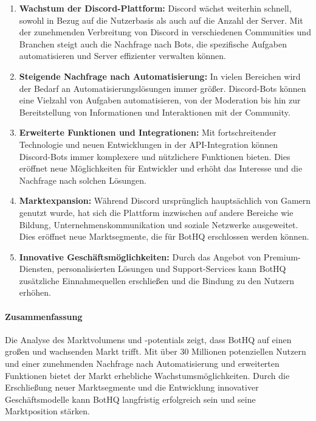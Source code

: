 \begin{enumerate}
  \item \textbf{Wachstum der Discord-Plattform:} Discord wächst weiterhin schnell, sowohl in Bezug auf die Nutzerbasis als auch auf die Anzahl der Server. Mit der zunehmenden Verbreitung von Discord in verschiedenen Communities und Branchen steigt auch die Nachfrage nach Bots, die spezifische Aufgaben automatisieren und Server effizienter verwalten können.

  \item \textbf{Steigende Nachfrage nach Automatisierung:} In vielen Bereichen wird der Bedarf an Automatisierungslösungen immer größer. Discord-Bots können eine Vielzahl von Aufgaben automatisieren, von der Moderation bis hin zur Bereitstellung von Informationen und Interaktionen mit der Community.

  \item \textbf{Erweiterte Funktionen und Integrationen:} Mit fortschreitender Technologie und neuen Entwicklungen in der API-Integration können Discord-Bots immer komplexere und nützlichere Funktionen bieten. Dies eröffnet neue Möglichkeiten für Entwickler und erhöht das Interesse und die Nachfrage nach solchen Lösungen.

  \item \textbf{Marktexpansion:} Während Discord ursprünglich hauptsächlich von Gamern genutzt wurde, hat sich die Plattform inzwischen auf andere Bereiche wie Bildung, Unternehmenskommunikation und soziale Netzwerke ausgeweitet. Dies eröffnet neue Marktsegmente, die für BotHQ erschlossen werden können.

  \item \textbf{Innovative Geschäftsmöglichkeiten:} Durch das Angebot von Premium-Diensten, personalisierten Lösungen und Support-Services kann BotHQ zusätzliche Einnahmequellen erschließen und die Bindung zu den Nutzern erhöhen.
\end{enumerate}

\paragraph{Zusammenfassung}
Die Analyse des Marktvolumens und -potentials zeigt, dass BotHQ auf einen großen und wachsenden Markt trifft. Mit über 30 Millionen potenziellen Nutzern und einer zunehmenden Nachfrage nach Automatisierung und erweiterten Funktionen bietet der Markt erhebliche Wachstumsmöglichkeiten. Durch die Erschließung neuer Marktsegmente und die Entwicklung innovativer Geschäftsmodelle kann BotHQ langfristig erfolgreich sein und seine Marktposition stärken.

